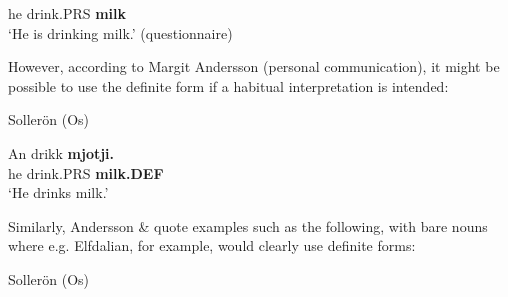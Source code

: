 he  drink.PRS  \textbf{milk}\\

\glt ‘He is drinking milk.’ (questionnaire)

\z

However, according to Margit Andersson (personal communication), it might be possible to use the definite form if a habitual interpretation is intended:


\item 

\label{bkm:Ref173318047}Sollerön (Os) 



 \ea\label{}
\gll An  drikk  \textbf{mjotji.}\\


he  drink.PRS  \textbf{milk.DEF}\\

\glt ‘He drinks milk.’ 

\z

Similarly, Andersson \& \citet{Danielsson1999} quote examples such as the following, with bare nouns where e.g. Elfdalian, for example, would clearly use definite forms:


\item 

Sollerön (Os) 



\item 


